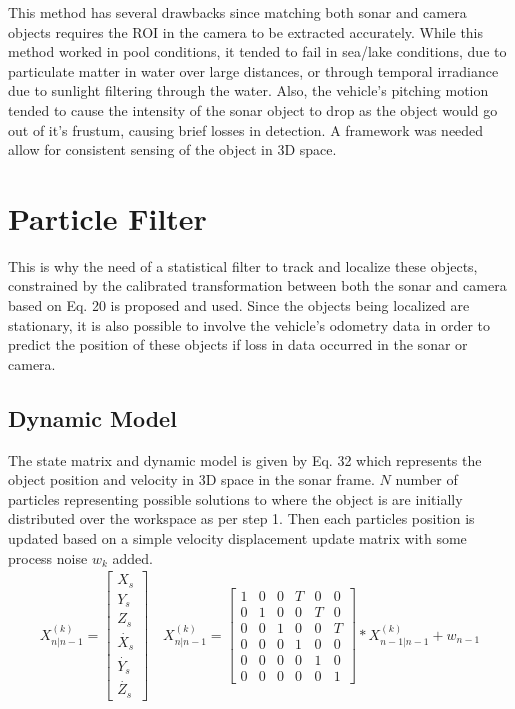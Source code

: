 \documentclass[15pt]{article}
\begin{document}
This method has several drawbacks since matching both sonar and camera objects requires the ROI in the camera to be extracted accurately. While this method worked in pool conditions, it tended to fail in sea/lake conditions, due to particulate matter in water over large distances, or through temporal irradiance due to sunlight filtering through the water. Also, the vehicle's pitching motion tended to cause the intensity of the sonar object to drop as the object would go out of it's frustum, causing brief losses in detection. A framework was needed allow for consistent sensing of the object in 3D space.

\section{Particle Filter}

This is why the need of a statistical filter to track and localize these objects, constrained by the calibrated transformation between both the sonar and camera based on Eq. 20 is proposed and used. Since the objects being localized are stationary, it is also possible to involve the vehicle's odometry data in order to predict the position of these objects if loss in data occurred in the sonar or camera. 

\subsection{Dynamic Model}

The state matrix and dynamic model is given by Eq. 32 which represents the object position and velocity in 3D space in the sonar frame. $N$ number of particles representing possible solutions to where the object is are initially distributed over the workspace as per step 1. Then each particles position is updated based on a simple velocity displacement update matrix with some process noise $w_{k}$ added.
\begin{gather}
X_{n|n-1}^{(k)}=\left[\begin{array}{c}
X_{s}\\
Y_{s}\\
Z_{s}\\
\dot{X_{s}}\\
\dot{Y_{s}}\\
\dot{Z_{s}}
\end{array}\right]\quad X_{n|n-1}^{(k)}=\left[\begin{array}{cccccc}
1 & 0 & 0 & T & 0 & 0\\
0 & 1 & 0 & 0 & T & 0\\
0 & 0 & 1 & 0 & 0 & T\\
0 & 0 & 0 & 1 & 0 & 0\\
0 & 0 & 0 & 0 & 1 & 0\\
0 & 0 & 0 & 0 & 0 & 1
\end{array}\right]*X_{n-1|n-1}^{(k)}+w_{n-1}
\end{gather}
\end{document}
